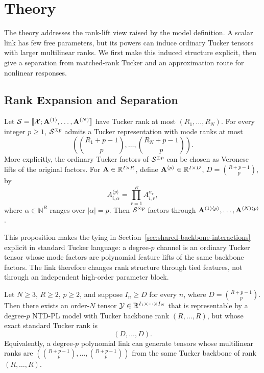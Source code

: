 \section{Theory}
\label{sec:theory}

The theory addresses the rank-lift view raised by the model definition. A
scalar link has few free parameters, but its powers can induce ordinary Tucker
tensors with larger multilinear ranks. We first make this induced structure
explicit, then give a separation from matched-rank Tucker and an approximation
route for nonlinear responses.

\subsection{Rank Expansion and Separation}

\begin{proposition}
\label{prop:rank-expansion}
Let
\(\mathcal{S}=\llbracket \mathcal{X}; \mathbf{A}^{(1)},\ldots,\mathbf{A}^{(N)} \rrbracket\)
have Tucker rank at most \((R_1,\ldots,R_N)\). For every integer \(p\ge 1\),
\(\mathcal{S}^{\odot p}\) admits a Tucker representation with mode ranks at most
\begin{equation}
  \left(
  \binom{R_1+p-1}{p},\ldots,\binom{R_N+p-1}{p}
  \right).
\end{equation}
More explicitly, the ordinary Tucker factors of \(\mathcal{S}^{\odot p}\) can be
chosen as Veronese lifts of the original factors. For
\(\mathbf{A}\in\mathbb{R}^{I\times R}\), define
\(\mathbf{A}^{\langle p\rangle}\in\mathbb{R}^{I\times D}\),
\(D=\binom{R+p-1}{p}\), by
\begin{equation}
  A^{\langle p\rangle}_{i,\alpha}
  =
  \prod_{r=1}^{R} A_{i,r}^{\alpha_r},
\end{equation}
where \(\alpha\in\mathbb N^R\) ranges over \(|\alpha|=p\).
Then \(\mathcal{S}^{\odot p}\) factors through
\(\mathbf{A}^{(1)\langle p\rangle},\ldots,\mathbf{A}^{(N)\langle p\rangle}\).
\end{proposition}

This proposition makes the tying in
Section~\ref{sec:shared-backbone-interactions} explicit in standard Tucker
language: a degree-\(p\) channel is an ordinary Tucker tensor whose mode
factors are polynomial feature lifts of the same backbone factors. The link
therefore changes rank structure through tied features, not through an
independent high-order parameter block.

\begin{theorem}
\label{thm:tucker-separation}
Let \(N\ge 3\), \(R\ge 2\), \(p\ge 2\), and suppose \(I_n\ge D\) for every
\(n\), where \(D=\binom{R+p-1}{p}\). Then there exists an order-\(N\) tensor
\(\mathcal{Y}\in\mathbb{R}^{I_1\times\cdots\times I_N}\) that is representable by a
degree-\(p\) NTD-PL model with Tucker backbone rank \((R,\ldots,R)\), but
whose exact standard Tucker rank is
\begin{equation}
  (D,\ldots,D).
\end{equation}
Equivalently, a degree-\(p\) polynomial link can generate tensors whose
multilinear ranks are
\((\binom{R+p-1}{p},\ldots,\binom{R+p-1}{p})\) from the same Tucker backbone
of rank \((R,\ldots,R)\).
\end{theorem}


